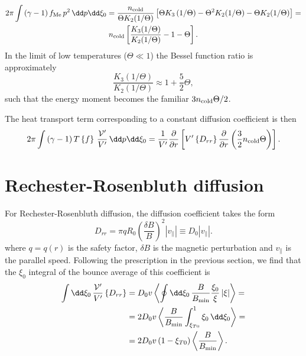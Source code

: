 \documentclass{notes}
\newcommand{\fMe}{f_{\rm Me}}
\newcommand{\ncold}{n_{\rm cold}}
\newcommand{\Vp}{\mathcal{V}'}
\newcommand{\VpVol}{V'}
\begin{document}
    \begin{equation}
        \begin{gathered}
            2\pi\int\left( \gamma-1 \right)\fMe\,p^2\,\dd p\dd\xi_0 =
            \frac{\ncold}{\Theta K_2(1/\Theta)} \left[
                \Theta K_3\left(1/\Theta\right) - \Theta^2 K_2(1/\Theta) - \Theta K_2(1/\Theta)
            \right] =\\
            \ncold\left[ \frac{K_3(1/\Theta)}{K_2(1/\Theta)} - 1 - \Theta \right].
        \end{gathered}
    \end{equation}
    In the limit of low temperatures ($\Theta\ll 1$) the Bessel function ratio
    is approximately
    \begin{equation}
        \frac{K_3(1/\Theta)}{K_2(1/\Theta)}\approx 1 + \frac{5}{2}\Theta,
    \end{equation}
    such that the energy moment becomes the familiar $3\ncold\Theta/2$.

    The heat transport term corresponding to a constant diffusion coefficient
    is then
    \begin{equation}
        2\pi\int\left(\gamma-1\right) T\left\{f\right\}\,\frac{\Vp}{\VpVol}\,\dd p\dd\xi_0 =
        \frac{1}{\VpVol}\frac{\partial}{\partial r}\left[
            \VpVol\left\{ D_{rr} \right\}\frac{\partial}{\partial r} \left( \frac{3}{2}\ncold\Theta \right)
        \right].
    \end{equation}

    \section{Rechester-Rosenbluth diffusion}
    For Rechester-Rosenbluth diffusion, the diffusion coefficient takes the form
    \begin{equation}
        D_{rr} = \pi qR_0\left( \frac{\delta B}{B} \right)^2 \left| v_\parallel \right|\equiv
        D_0 \left| v_\parallel \right|.
    \end{equation}
    where $q=q(r)$ is the safety factor, $\delta B$ is the magnetic perturbation
    and $v_\parallel$ is the parallel speed. Following the prescription in the
    previous section, we find that the $\xi_0$ integral of the bounce average of
    this coefficient is
    \begin{equation}
        \begin{aligned}
            \int\dd\xi_0\,\frac{\Vp}{\VpVol}\left\{ D_{rr} \right\} &=
            D_0v\left\langle\oint\dd\xi_0\,\frac{B}{B_{\rm min}}\frac{\xi_0}{\xi}\left|\xi\right|\right\rangle =\\
            &= 2D_0v\left\langle \frac{B}{B_{\rm min}}\int_{\xi_{T0}}^1\xi_0\,\dd\xi_0\right\rangle =\\
            &= 2D_0v\left( 1 - \xi_{T0} \right)\left\langle \frac{B}{B_{\rm min}} \right\rangle.
        \end{aligned}
    \end{equation}
\end{document}
